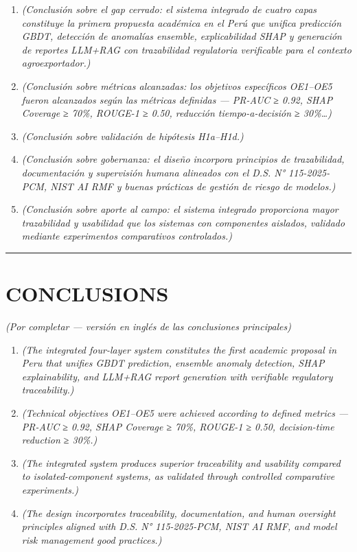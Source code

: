 \begin{enumerate}
\def\labelenumi{\arabic{enumi}.}
\item
  \emph{(Conclusión sobre el gap cerrado: el sistema integrado de cuatro
  capas constituye la primera propuesta académica en el Perú que unifica
  predicción GBDT, detección de anomalías ensemble, explicabilidad SHAP
  y generación de reportes LLM+RAG con trazabilidad regulatoria
  verificable para el contexto agroexportador.)}
\item
  \emph{(Conclusión sobre métricas alcanzadas: los objetivos específicos
  OE1--OE5 fueron alcanzados según las métricas definidas --- PR-AUC ≥
  0.92, SHAP Coverage ≥ 70\%, ROUGE-1 ≥ 0.50, reducción
  tiempo-a-decisión ≥ 30\%\ldots)}
\item
  \emph{(Conclusión sobre validación de hipótesis H1a--H1d.)}
\item
  \emph{(Conclusión sobre gobernanza: el diseño incorpora principios de
  trazabilidad, documentación y supervisión humana alineados con el D.S.
  N° 115-2025-PCM, NIST AI RMF y buenas prácticas de gestión de riesgo
  de modelos.)}
\item
  \emph{(Conclusión sobre aporte al campo: el sistema integrado
  proporciona mayor trazabilidad y usabilidad que los sistemas con
  componentes aislados, validado mediante experimentos comparativos
  controlados.)}
\end{enumerate}

\begin{center}\rule{0.5\linewidth}{0.5pt}\end{center}

\section{CONCLUSIONS}\label{conclusions}

\emph{(Por completar --- versión en inglés de las conclusiones
principales)}

\begin{enumerate}
\def\labelenumi{\arabic{enumi}.}
\item
  \emph{(The integrated four-layer system constitutes the first academic
  proposal in Peru that unifies GBDT prediction, ensemble anomaly
  detection, SHAP explainability, and LLM+RAG report generation with
  verifiable regulatory traceability.)}
\item
  \emph{(Technical objectives OE1--OE5 were achieved according to
  defined metrics --- PR-AUC ≥ 0.92, SHAP Coverage ≥ 70\%, ROUGE-1 ≥
  0.50, decision-time reduction ≥ 30\%.)}
\item
  \emph{(The integrated system produces superior traceability and
  usability compared to isolated-component systems, as validated through
  controlled comparative experiments.)}
\item
  \emph{(The design incorporates traceability, documentation, and human
  oversight principles aligned with D.S. N° 115-2025-PCM, NIST AI RMF,
  and model risk management good practices.)}
\end{enumerate}

